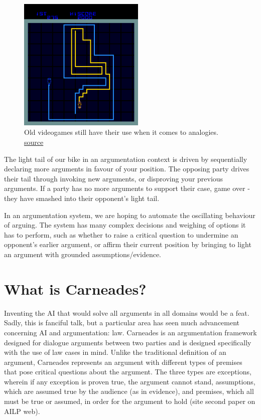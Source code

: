 \documentclass[10pt,a4paper,twocolumn]{article}
\begin{document}
\begin{figure}[h]
  \includegraphics[width=6cm]
  {images/lightCycle.png}
  \centering
  \caption{Old videogames still have their use when it comes to analogies.
	  \href{http://www.arcade-history.com/images/game/2979_1.png }{source}}
\end{figure}

The light tail of our bike in an argumentation context is driven by sequentially declaring
more arguments in favour of your position. The opposing party drives their tail
through invoking new arguments, or disproving your previous arguments. If
a party has no more arguments to support their case, game over - they have
smashed into their opponent's light tail.

In an argumentation system, we are hoping to automate the oscillating behaviour
of arguing. The system has many complex decisions and weighing of options it has
to perform, such as whether to raise a critical question to undermine an
opponent's earlier argument, or affirm their current position by bringing to light an
argument with grounded assumptions/evidence.

\section{What is Carneades?}

Inventing the AI that would solve all arguments in all domains would be a feat.
Sadly, this is fanciful talk, but a particular area has seen
much advancement concerning AI and argumentation: law. Carneades is an
argumentation framework designed for dialogue arguments between two parties and
is designed specifically with the use of law cases in mind. Unlike the
traditional definition of an argument, Carneades represents an argument with different types of
premises that pose critical questions about the argument. The three types
are exceptions, wherein if any exception is proven true, the argument cannot
stand, assumptions, which are assumed true by the audience (as in evidence), and
premises, which all must be true or assumed, in order for the argument to hold
(site second paper on AILP web).
\end{document}
